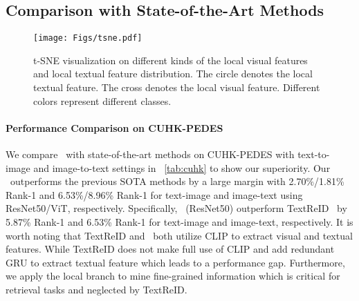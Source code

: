 \subsection{Comparison with State-of-the-Art Methods}

\begin{figure*}[t]
	\centering
	\texttt{[image: Figs/tsne.pdf]}
	\caption{\small{t-SNE visualization on different kinds of the local visual features and local textual feature distribution. The circle denotes the local textual feature. The cross denotes the local visual feature. Different colors represent different classes. 
}}\label{fig:tsne}
\end{figure*}
\paragraph{Performance Comparison on CUHK-PEDES}
We compare \ourmodel~with state-of-the-art methods on CUHK-PEDES with text-to-image and image-to-text settings in \tablename~\ref{tab:cuhk} to show our superiority.
Our \ourmodel~outperforms the previous SOTA methods by a large margin with 2.70\%/1.81\% Rank-1 and 6.53\%/8.96\% Rank-1 for text-image and image-text using ResNet50/ViT, respectively.
Specifically, \ourmodel~(ResNet50) outperform TextReID~\cite{textreid} by 5.87\% Rank-1 and 6.53\% Rank-1 for text-image and image-text, respectively. It is worth noting that TextReID and \ourmodel~both utilize CLIP to extract visual and textual features. While TextReID does not make full use of CLIP and add redundant GRU to extract textual feature which leads to a performance gap. Furthermore, we apply the local branch to mine fine-grained information which is critical for retrieval tasks and neglected by TextReID. 

